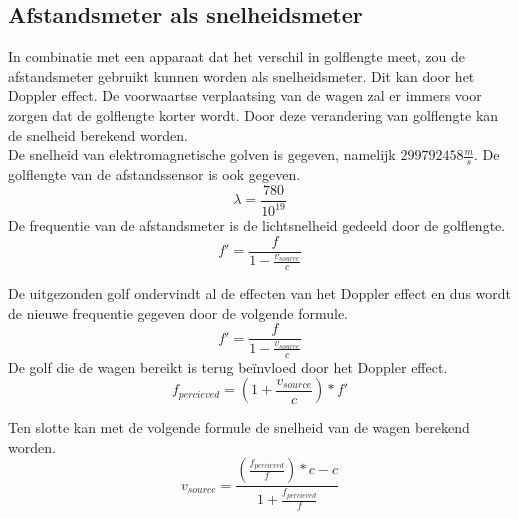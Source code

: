  

\subsection{Afstandsmeter als snelheidsmeter}
In combinatie met een apparaat dat het verschil in golflengte meet, zou de afstandsmeter gebruikt kunnen worden als snelheidsmeter. Dit kan door het Doppler effect. De voorwaartse verplaatsing van de wagen zal er immers voor zorgen dat de golflengte korter wordt. Door deze verandering van golflengte kan de snelheid berekend worden.\\

De snelheid van elektromagnetische golven is gegeven, namelijk $299792458 \frac{m}{s}$. De golflengte van de afstandssensor is ook gegeven. $$\lambda = \frac{780}{10^{19}}$$
De frequentie van de afstandsmeter is de lichtsnelheid gedeeld door de golflengte.
\begin{equation}
f'=\frac{f}{1-\frac{v_{source}}{c}}
\end{equation}

De uitgezonden golf ondervindt al de effecten van het Doppler effect en dus wordt de nieuwe frequentie gegeven door de volgende formule.
\begin{equation}
f'=\frac{f}{1-\frac{v_{source}}{c}}
\end{equation}
De golf die de wagen bereikt is terug beïnvloed door het Doppler effect.
\begin{equation}
f_{percieved}=\left(1+\frac{v_{source}}{c}\right)*f'
\end{equation}

Ten slotte kan met de volgende formule de snelheid van de wagen berekend worden.
\begin{equation}
v_{source} = \frac{\left(\frac{f_{percieved}}{f}\right)*c-c}{1+\frac{f_{percieved}}{f}}
\end{equation}

